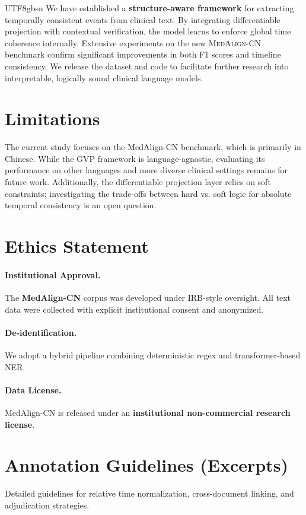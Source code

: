 \documentclass[11pt]{article}
\begin{document}
\begin{CJK*}{UTF8}{gbsn}
We have established a \textbf{structure-aware framework} for extracting temporally consistent events from clinical text. By integrating differentiable projection with contextual verification, the model learns to enforce global time coherence internally. Extensive experiments on the new \textsc{MedAlign-CN} benchmark confirm significant improvements in both F1 scores and timeline consistency. We release the dataset and code to facilitate further research into interpretable, logically sound clinical language models.

\section*{Limitations}
The current study focuses on the MedAlign-CN benchmark, which is primarily in Chinese. While the GVP framework is language-agnostic, evaluating its performance on other languages and more diverse clinical settings remains for future work. Additionally, the differentiable projection layer relies on soft constraints; investigating the trade-offs between hard vs. soft logic for absolute temporal consistency is an open question.




\section*{Ethics Statement}
\label{sec:ethics}
\paragraph{Institutional Approval.} The \textbf{MedAlign-CN} corpus was developed under IRB-style oversight. All text data were collected with explicit institutional consent and anonymized.
\paragraph{De-identification.} We adopt a hybrid pipeline combining deterministic regex and transformer-based NER.
\paragraph{Data License.} MedAlign-CN is released under an \textbf{institutional non-commercial research license}.



\appendix

\section{Annotation Guidelines (Excerpts)}
\label{app:ann_guidelines}
Detailed guidelines for relative time normalization, cross-document linking, and adjudication strategies.


\end{CJK*}
\end{document}
